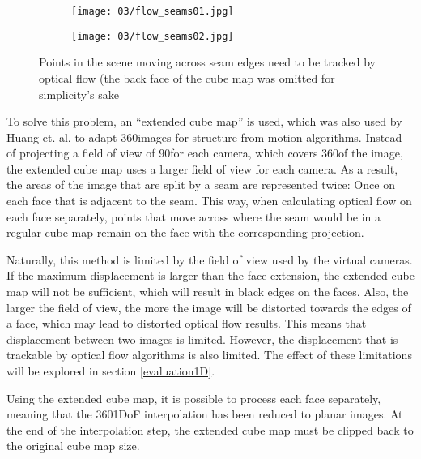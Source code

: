 \begin{figure}
\centering
    \hfill
    \begin{subfigure}[t]{0.5\textwidth}            
            \centering
            \texttt{[image: 03/flow\_seams01.jpg]}
            \caption{}
    \end{subfigure}%
    \hfill
    \begin{subfigure}[t]{0.5\textwidth}
            \centering
            \texttt{[image: 03/flow\_seams02.jpg]}
            \caption{}
    \end{subfigure}
    \hfill
    \hfill
  \caption[]{Points in the scene moving across seam edges need to be tracked by optical flow (the back face of the cube map was omitted for simplicity's sake} \label{fig:flow_seams}
\end{figure}


To solve this problem, an ``extended cube map'' is used, which was also used by Huang et. al. \cite{6dof} to adapt 360\degree images for structure-from-motion algorithms. Instead of projecting a field of view of 90\degree for each camera, which covers 360\degree of the image, the extended cube map uses a larger field of view for each camera. As a result, the areas of the image that are split by a seam are represented twice: Once on each face that is adjacent to the seam. This way, when calculating optical flow on each face separately, points that move across where the seam would be in a regular cube map remain on the face with the corresponding projection. 

Naturally, this method is limited by the field of view used by the virtual cameras. If the maximum displacement is larger than the face extension, the extended cube map will not be sufficient, which will result in black edges on the faces. Also, the larger the field of view, the more the image will be distorted towards the edges of a face, which may lead to distorted optical flow results. This means that displacement between two images is limited. However, the displacement that is trackable by optical flow algorithms is also limited. The effect of these limitations will be explored in section \ref{evaluation1D}.

Using the extended cube map, it is possible to process each face separately, meaning that the 360\degree 1DoF interpolation has been reduced to planar images. At the end of the interpolation step, the extended cube map must be clipped back to the original cube map size.

